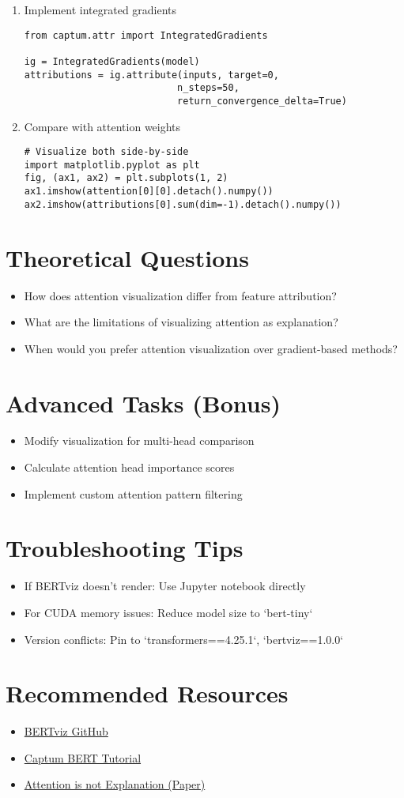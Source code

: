 \begin{enumerate}
\item Implement integrated gradients
\begin{verbatim}
from captum.attr import IntegratedGradients

ig = IntegratedGradients(model)
attributions = ig.attribute(inputs, target=0, 
                           n_steps=50, 
                           return_convergence_delta=True)
\end{verbatim}

\item Compare with attention weights
\begin{verbatim}
# Visualize both side-by-side
import matplotlib.pyplot as plt
fig, (ax1, ax2) = plt.subplots(1, 2)
ax1.imshow(attention[0][0].detach().numpy())
ax2.imshow(attributions[0].sum(dim=-1).detach().numpy())
\end{verbatim}
\end{enumerate}

\section*{Theoretical Questions}
\begin{itemize}
\item How does attention visualization differ from feature attribution?
\item What are the limitations of visualizing attention as explanation?
\item When would you prefer attention visualization over gradient-based methods?
\end{itemize}

\section*{Advanced Tasks (Bonus)}
\begin{itemize}
\item Modify visualization for multi-head comparison
\item Calculate attention head importance scores
\item Implement custom attention pattern filtering
\end{itemize}

\section*{Troubleshooting Tips}
\begin{itemize}
\item If BERTviz doesn't render: Use Jupyter notebook directly
\item For CUDA memory issues: Reduce model size to `bert-tiny`
\item Version conflicts: Pin to `transformers==4.25.1`, `bertviz==1.0.0`
\end{itemize}

\section*{Recommended Resources}
\begin{itemize}
\item \href{https://github.com/jessevig/bertviz}{BERTviz GitHub}
\item \href{https://captum.ai/tutorials/Bert_SQUAD_Interpret}{Captum BERT Tutorial}
\item \href{https://arxiv.org/abs/2004.10102}{Attention is not Explanation (Paper)}
\end{itemize}